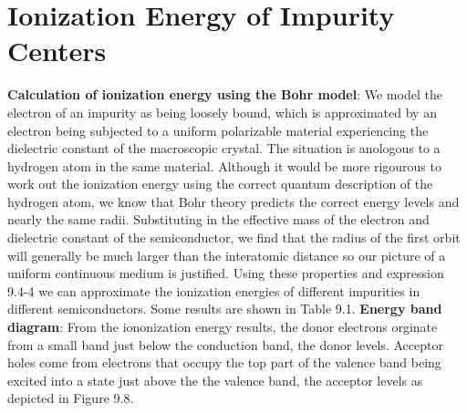 \documentclass{article}
\numberwithin{equation}{section}
\begin{document}
\section*{Ionization Energy of Impurity Centers}
\textbf{Calculation of ionization energy using the Bohr model}: We model the electron of an impurity as being loosely bound, which is approximated by an electron being subjected to a uniform polarizable material experiencing the dielectric constant of the macroscopic crystal. The situation is anologous to a hydrogen atom in the same material. Although it would be more rigourous to work out the ionization energy using the correct quantum description of the hydrogen atom, we know that Bohr theory predicts the correct energy levels and nearly the same radii. Substituting in the effective mass of the electron and dielectric constant of the semiconductor, we find that the radius of the first orbit will generally be much larger than the interatomic distance so our picture of a uniform continuous medium is justified. Using these properties and expression 9.4-4 we can approximate the ionization energies of different impurities in different semiconductors. Some results are shown in Table 9.1.
\newline
\textbf{Energy band diagram}: From the iononization energy results, the donor electrons orginate from a small band just below the conduction band, the donor levels. Acceptor holes come from electrons that occupy the top part of the valence band being excited into a state just above the the valence band, the acceptor levels as depicted in Figure 9.8.
\newline
\end{document}
